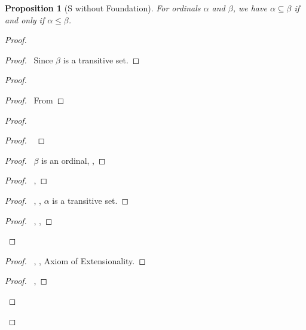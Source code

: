 \documentclass{book}
\let\qed\relax
\newtheorem{prop}[ax]{Proposition}
\theoremstyle{definition}
\begin{document}
\begin{prop}[S without Foundation]
\label{prop:ordinalsubset}
For ordinals $\alpha$ and $\beta$, we have $\alpha \subseteq \beta$ if and only if $\alpha \leq \beta$.
\end{prop}

\begin{proof}
\pf
{}
\begin{proof}
	\pf\ Since $\beta$ is a transitive set.
\end{proof}
\begin{proof}
	\begin{proof}
		\pf\ From 
	\end{proof}
	\begin{proof}
		\begin{proof}
			\pf\ 
		\end{proof}
		\begin{proof}
			\pf\ $\beta$ is an ordinal, , 
		\end{proof}
		\begin{proof}
			\pf\ , 
		\end{proof}
		\begin{proof}
			\pf\ , , $\alpha$ is a transitive set.
		\end{proof}
		\begin{proof}
			\pf\ , , 
		\end{proof}
	\end{proof}
	\begin{proof}
		\pf\ , , Axiom of Extensionality.
	\end{proof}
	\begin{proof}
		\pf\ , 
	\end{proof}
\end{proof}
\qed
\end{proof}
\end{document}
